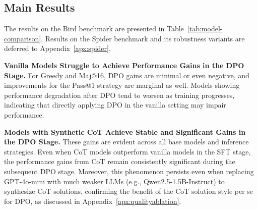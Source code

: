 \subsection{Main Results}

The results on the Bird benchmark are presented in Table~\ref{tab:model-comparison}. Results on the Spider benchmark and its robustness variants are deferred to Appendix~\ref{apx:spider}. 


\textbf{Vanilla Models Struggle to Achieve Performance Gains in the DPO Stage.} 
For Greedy and Maj@16, DPO gains are minimal or even negative, and improvements for the Pass@1 strategy are marginal as well. Models showing performance degradation after DPO tend to worsen as training progresses, indicating that directly applying DPO in the vanilla setting may impair performance.


\textbf{Models with Synthetic CoT Achieve Stable and Significant Gains in the DPO Stage.}
These gains are evident across all base models and inference strategies. Even when CoT models outperform vanilla models in the SFT stage, the performance gains from CoT remain consistently significant during the subsequent DPO stage. Moreover, this phenomenon persists even when replacing GPT-4o-mini with much weaker LLMs (e.g., Qwen2.5-1.5B-Instruct) to synthesize CoT solutions, confirming the benefit of the CoT solution style per se for DPO, as discussed in Appendix~\ref{apx:qualityablation}.

